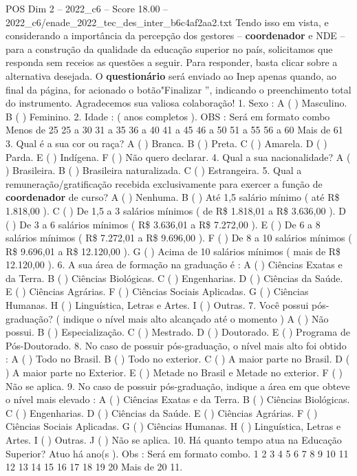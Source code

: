 \begin{textsample}{POS Dim 2 – 2022\_c6 – Score 18.00 – 2022\_c6/enade\_2022\_tec\_des\_inter\_b6c4af2aa2.txt}
Tendo isso em vista, e considerando a importância da percepção dos gestores – \textbf{coordenador} e NDE – para a construção da qualidade da educação superior no país, solicitamos que responda sem receios as questões a seguir.
Para responder, basta clicar sobre a alternativa desejada.
O \textbf{questionário} será enviado ao Inep apenas quando, ao final da página, for acionado o botão"Finalizar ”, indicando o preenchimento total do instrumento.
Agradecemos sua valiosa colaboração! 1.
Sexo : A ( ) Masculino.
B ( ) Feminino. 2.
Idade : ( anos completos ).
OBS : Será em formato combo Menos de 25 25 a 30 31 a 35 36 a 40 41 a 45 46 a 50 51 a 55 56 a 60 Mais de 61 3.
Qual é a sua cor ou raça?
A ( ) Branca.
B ( ) Preta.
C ( ) Amarela.
D ( ) Parda.
E ( ) Indígena.
F ( ) Não quero declarar. 4.
Qual a sua nacionalidade?
A ( ) Brasileira.
B ( ) Brasileira naturalizada.
C ( ) Estrangeira. 5.
Qual a remuneração/gratificação recebida exclusivamente para exercer a função de \textbf{coordenador} de curso?
A ( ) Nenhuma.
B ( ) Até 1,5 salário mínimo ( até R\$ 1.818,00 ).
C ( ) De 1,5 a 3 salários mínimos ( de R\$ 1.818,01 a R\$ 3.636,00 ).
D ( ) De 3 a 6 salários mínimos ( R\$ 3.636,01 a R\$ 7.272,00 ).
E ( ) De 6 a 8 salários mínimos ( R\$ 7.272,01 a R\$ 9.696,00 ).
F ( ) De 8 a 10 salários mínimos ( R\$ 9.696,01 a R\$ 12.120,00 ).
G ( ) Acima de 10 salários mínimos ( mais de R\$ 12.120,00 ). 6.
A sua área de formação na graduação é : A ( ) Ciências Exatas e da Terra.
B ( ) Ciências Biológicas.
C ( ) Engenharias.
D ( ) Ciências da Saúde.
E ( ) Ciências Agrárias.
F ( ) Ciências Sociais Aplicadas.
G ( ) Ciências Humanas.
H ( ) Linguística, Letras e Artes.
I ( ) Outras. 7.
Você possui pós-graduação? ( indique o nível mais alto alcançado até o momento ) A ( ) Não possui.
B ( ) Especialização.
C ( ) Mestrado.
D ( ) Doutorado.
E ( ) Programa de Pós-Doutorado. 8.
No caso de possuir pós-graduação, o nível mais alto foi obtido : A ( ) Todo no Brasil.
B ( ) Todo no exterior.
C ( ) A maior parte no Brasil.
D ( ) A maior parte no Exterior.
E ( ) Metade no Brasil e Metade no exterior.
F ( ) Não se aplica. 9.
No caso de possuir pós-graduação, indique a área em que obteve o nível mais elevado : A ( ) Ciências Exatas e da Terra.
B ( ) Ciências Biológicas.
C ( ) Engenharias.
D ( ) Ciências da Saúde.
E ( ) Ciências Agrárias.
F ( ) Ciências Sociais Aplicadas.
G ( ) Ciências Humanas.
H ( ) Linguística, Letras e Artes.
I ( ) Outras.
J ( ) Não se aplica. 10.
Há quanto tempo atua na Educação Superior?
Atuo há ano(s ).
Obs : Será em formato combo. 1 2 3 4 5 6 7 8 9 10 11 12 13 14 15 16 17 18 19 20 Mais de 20 11.

\end{textsample}
